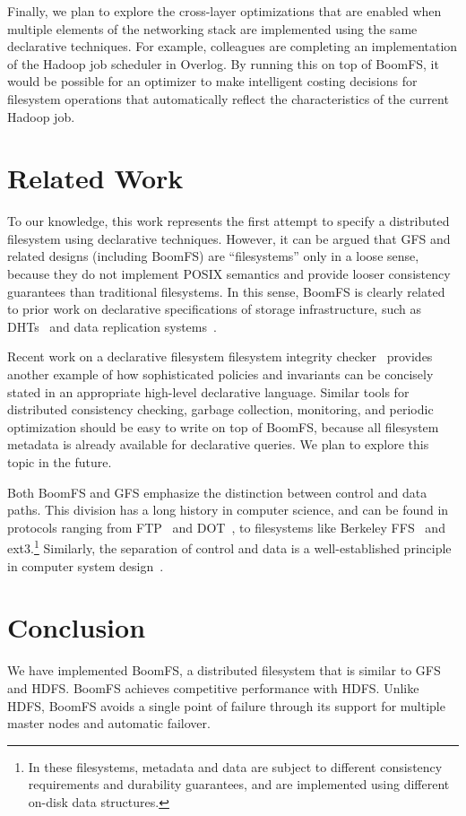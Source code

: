 \documentclass{article}
\begin{document}
Finally, we plan to explore the cross-layer optimizations that are
enabled when multiple elements of the networking stack are implemented
using the same declarative techniques. For example, colleagues are
completing an implementation of the Hadoop job scheduler in
Overlog. By running this on top of BoomFS, it would be possible for an
optimizer to make intelligent costing decisions for filesystem
operations that automatically reflect the characteristics of the
current Hadoop job.

\section{Related Work}
\label{related-work}
To our knowledge, this work represents the first attempt to specify a
distributed filesystem using declarative techniques. However, it can
be argued that GFS and related designs (including BoomFS) are
``filesystems'' only in a loose sense, because they do not implement
POSIX semantics and provide looser consistency guarantees than
traditional filesystems. In this sense, BoomFS is clearly related to
prior work on declarative specifications of storage infrastructure,
such as DHTs~\cite{chord-overlog} and data replication
systems~\cite{padre-draft}.

Recent work on a declarative filesystem filesystem integrity
checker~\cite{sqck} provides another example of how sophisticated
policies and invariants can be concisely stated in an appropriate
high-level declarative language. Similar tools for distributed
consistency checking, garbage collection, monitoring, and periodic
optimization should be easy to write on top of BoomFS, because all
filesystem metadata is already available for declarative queries. We
plan to explore this topic in the future.

Both BoomFS and GFS emphasize the distinction between control and data
paths. This division has a long history in computer science, and can
be found in protocols ranging from FTP~\cite{ftp-rfc} and
DOT~\cite{dot}, to filesystems like Berkeley FFS~\cite{ffs} and
ext3.\footnote{In these filesystems, metadata and data are subject to
  different consistency requirements and durability guarantees, and
  are implemented using different on-disk data structures.} Similarly,
the separation of control and data is a well-established principle in
computer system design~\cite{hydra-policy-mech-sep}.

\section{Conclusion}
\label{conclusion}
We have implemented BoomFS, a distributed filesystem that is similar
to GFS and HDFS. BoomFS achieves competitive performance with
HDFS. Unlike HDFS, BoomFS avoids a single point of failure through its
support for multiple master nodes and automatic failover.
\end{document}
